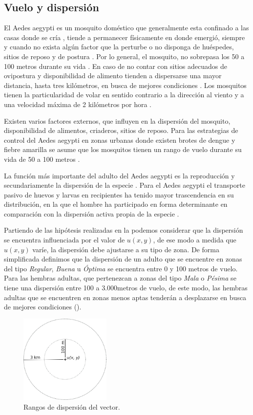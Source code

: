 
\subsection{Vuelo y dispersión}
\label{subsec:cap4-vuelo-dispersion}
El Aedes aegypti es un mosquito doméstico que generalmente esta confinado a las casas donde se
cría \cite{luevano1993ciclo}, tiende a permanecer físicamente en donde emergió, siempre y cuando
no exista algún factor que la perturbe o no disponga de huéspedes, sitios de reposo y de postura
\cite{ThironIzcazaJ2003}. Por lo general, el mosquito, no sobrepasa los 50 a 100 metros durante su
vida \cite{cabezas2005dengue}. En caso de no contar con sitios adecuados de ovipostura y
disponibilidad de alimento tienden a dispersarse una mayor distancia, hasta tres kilómetros, en
busca de mejores condiciones \cite{ThironIzcazaJ2003}. Los mosquitos tienen la particularidad de
volar en sentido contrario a la dirección al viento \cite{ThironIzcazaJ2003,web-site:speedAnimals}
y a una velocidad máxima de 2 kilómetros por hora \cite{web-site:speedAnimals,kaufmann2004flight}.

Existen varios factores externos, que influyen en la dispersión del mosquito, disponibilidad de
alimentos, criaderos, sitios de reposo. Para las estrategias de control del Aedes aegypti en zonas
urbanas donde existen brotes de dengue y fiebre amarilla se asume que los mosquitos tienen un
rango de vuelo durante su vida de 50 a 100 metros \cite{dengueUruguayCap8}.

La función más importante del adulto del Aedes aegypti es la reproducción y secundariamente la
dispersión de la especie \cite{ThironIzcazaJ2003}. Para el Aedes aegypti el transporte pasivo de
huevos y larvas en recipientes ha tenido mayor trascendencia en su distribución, en la que el
hombre ha participado en forma determinante en comparación con la dispersión activa propia de la
especie \citep{ThironIzcazaJ2003}.

Partiendo de las hipótesis realizadas en la  podemos considerar
que la dispersión se encuentra influenciada por el valor de $u(x,y)$, de ese modo a medida que
$u(x,y)$ varíe, la dispersión debe ajustarse a su tipo de zona. De forma simplificada definimos que
la dispersión de un adulto que se encuentre en zonas del tipo \textit{Regular}, \textit{Buena} u
\textit{Óptima} se encuentra entre 0 y 100 metros de vuelo. Para las hembras adultas, que
pertenezcan a zonas del tipo \textit{Mala} o \textit{Pésima} se tiene una dispersión entre 100 a
$3.000 $metros de vuelo, de este modo, las hembras adultas que se encuentren en zonas menos aptas
tenderán a desplazarse en busca de mejores condiciones ().

\begin{figure}[!hptb]
\centering
\includegraphics[width=0.4\textwidth]{capitulo-4/graphics/rango-vuelo.png}
\caption{\label{fig:cap4-dispersion} Rangos de dispersión del vector.}
\end{figure}
